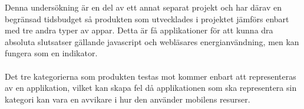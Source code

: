 Denna undersökning är en del av ett annat separat projekt och har därav en begränsad tidsbudget så produkten som utvecklades i projektet jämförs enbart med tre andra typer av appar. Detta är få applikationer för att kunna dra absoluta slutsatser gällande javascript och webläsares energianvändning, men kan fungera som en indikator.\\\\
Det tre kategorierna som produkten testas mot kommer enbart att representeras av en applikation, vilket kan skapa fel då applikationen som ska representera sin kategori kan vara en avvikare i hur den använder mobilens resurser.

